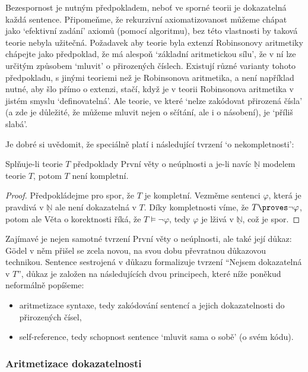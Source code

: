 Bezespornost je nutným předpokladem, neboť ve sporné teorii je dokazatelná každá sentence. Připomeňme, že rekurzivní axiomatizovanost můžeme chápat jako `efektivní zadání' axiomů (pomocí algoritmu), bez této vlastnosti by taková teorie nebyla užitečná. Požadavek aby teorie byla extenzí Robinsonovy aritmetiky chápejte jako předpoklad, že má alespoň `základní aritmetickou sílu', že v ní lze určitým způsobem `mluvit' o přirozených číslech. Existují různé varianty tohoto předpokladu, s jinými teoriemi než je Robinsonova aritmetika, a není například nutné, aby šlo přímo o extenzi, stačí, když je v teorii Robinsonova aritmetika v jistém smyslu `definovatelná'. Ale teorie, ve které `nelze zakódovat přirozená čísla' (a zde je důležité, že můžeme mluvit nejen o sčítání, ale i o násobení), je `příliš slabá'.

Je dobré si uvědomit, že speciálně platí i následující tvrzení `o nekompletnosti':

\begin{corollary}
    Splňuje-li teorie $T$ předpoklady První věty o neúplnosti a je-li navíc $\underline{\mathbb N}$ modelem teorie $T$, potom $T$ není kompletní.
\end{corollary}
\begin{proof}
    Předpokládejme pro spor, že $T$ je kompletní. Vezměme sentenci $\varphi$, která je pravdivá v $\underline{\mathbb N}$ ale není dokazatelná v $T$. Díky kompletnosti víme, že $T\proves\neg\varphi$, potom ale Věta o korektnosti říká, že  $T\models\neg\varphi$, tedy $\varphi$ je lživá v $\underline{\mathbb N}$, což je spor.
\end{proof}

Zajímavé je nejen samotné tvrzení První věty o neúplnosti, ale také její důkaz: Gödel v něm přišel se zcela novou, na svou dobu převratnou důkazovou technikou. Sentence sestrojená v důkazu formalizuje tvrzení \alert{``Nejsem dokazatelná v $T$''}, důkaz je založen na následujících dvou principech, které níže poněkud neformálně popíšeme:
\begin{itemize}
    \item \alert{aritmetizace syntaxe}, tedy zakódování sentencí a jejich dokazatelnosti do přirozených čísel,
    \item \alert{self-reference}, tedy schopnost sentence `mluvit sama o sobě' (o svém kódu).
\end{itemize}

\subsubsection*{Aritmetizace dokazatelnosti}

